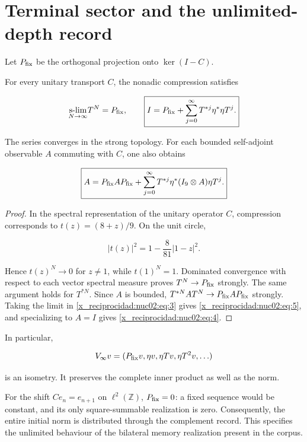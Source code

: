\section{Terminal sector and the unlimited-depth record}

Let \(P_{\rm fix}\) be the orthogonal projection onto \(\ker(I-C)\).

\begin{theorem}
For every unitary transport \(C\), the nonadic compression satisfies

\begin{equation}
\underset{N\to\infty}{\operatorname{s-lim}}T^N=P_{\rm fix},\qquad
\boxed{I=P_{\rm fix}+\sum_{j=0}^{\infty}T^{*j}\eta^*\eta T^j.}\label{x_reciprocidad:nuc02:eq:4}
\end{equation}

The series converges in the strong topology. For each bounded self-adjoint observable \(A\) commuting with \(C\), one also obtains

\begin{equation}
\boxed{A=P_{\rm fix}AP_{\rm fix}
+\sum_{j=0}^{\infty}T^{*j}\eta^*(I_9\otimes A)\eta T^j.}\label{x_reciprocidad:nuc02:eq:5}
\end{equation}
\end{theorem}

\begin{proof}
In the spectral representation of the unitary operator \(C\), compression corresponds to \(t(z)=(8+z)/9\). On the unit circle,

\[
|t(z)|^2=1-\frac8{81}|1-z|^2.
\]

Hence \(t(z)^N\to0\) for \(z\ne1\), while \(t(1)^N=1\). Dominated convergence with respect to each vector spectral measure proves \(T^N\to P_{\rm fix}\) strongly. The same argument holds for \(T^{*N}\). Since \(A\) is bounded, \(T^{*N}AT^N\to P_{\rm fix}AP_{\rm fix}\) strongly. Taking the limit in \eqref{x_reciprocidad:nuc02:eq:3} gives \eqref{x_reciprocidad:nuc02:eq:5}, and specializing to \(A=I\) gives \eqref{x_reciprocidad:nuc02:eq:4}.
\end{proof}

In particular,

\[
V_\infty v=(P_{\rm fix}v,\eta v,\eta Tv,\eta T^2v,\ldots)
\]

is an isometry. It preserves the complete inner product as well as the norm.

\begin{corollary}
For the shift \(Ce_n=e_{n+1}\) on \(\ell^2(\mathbb Z)\), \(P_{\rm fix}=0\): a fixed sequence would be constant, and its only square-summable realization is zero. Consequently, the entire initial norm is distributed through the complement record. This specifies the unlimited behaviour of the bilateral memory realization present in the corpus.
\end{corollary}

